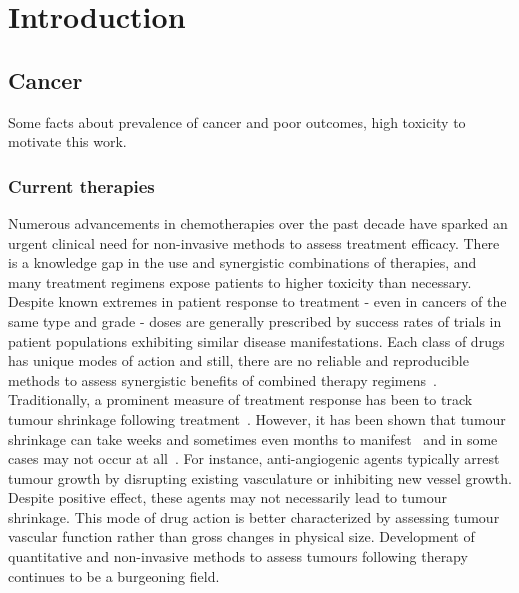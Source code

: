 
\chapter{Introduction}
\label{ch:Introduction}

\section{Cancer}

Some facts about prevalence of cancer and poor outcomes, high toxicity to motivate this work.

\subsection{Current therapies}
Numerous advancements in chemotherapies over the past decade have sparked an urgent clinical need for non-invasive methods to assess treatment efficacy.
There is a knowledge gap in the use and synergistic combinations of therapies, and many treatment regimens expose patients to higher toxicity than necessary.
Despite known extremes in patient response to treatment - even in cancers of the same type and grade - doses are generally prescribed by success rates of trials in patient populations exhibiting similar disease manifestations.
Each class of drugs has unique modes of action and still, there are no reliable and reproducible methods to assess synergistic benefits of combined therapy regimens~\cite{Zhang:2008ie}.
Traditionally, a prominent measure of treatment response has been to track tumour shrinkage following treatment~\cite{Tuma:2006hx}.
However, it has been shown that tumour shrinkage can take weeks and sometimes even months to manifest~\cite{Brindle:2008jt} and in some cases may not occur at all~\cite{Kitzen:2008un}.
For instance, anti-angiogenic agents typically arrest tumour growth by disrupting existing vasculature or inhibiting new vessel growth.
Despite positive effect, these agents may not necessarily lead to tumour shrinkage.
This mode of drug action is better characterized by assessing tumour vascular function rather than gross changes in physical size.
Development of quantitative and non-invasive methods to assess tumours following therapy continues to be a burgeoning field.
